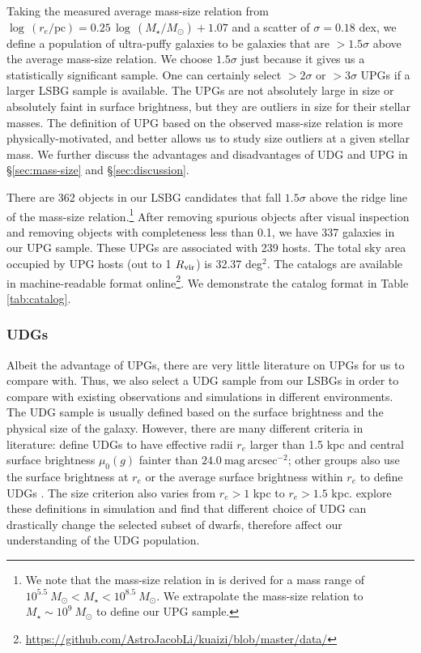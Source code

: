 \documentclass[twocolumn,astrosymb,twocolappendix]{aastex631}
\newcommand{\sbunit}{\mathrm{mag\ arcsec}^{-2}}
\begin{document}
\begin{CJK*}{UTF8}{gbsn}
Taking the measured average mass-size relation from \citet{ELVES-I} $\log\, (r_e/\mathrm{pc}) = 0.25\, \log\, (M_\star/M_\odot) + 1.07$ and a scatter of $\sigma=0.18$ dex, we define a population of ultra-puffy galaxies to be galaxies that are $>1.5\sigma$ above the average mass-size relation. We choose $1.5\sigma$ just because it gives us a statistically significant sample. One can certainly select $>2\sigma$ or $>3\sigma$ UPGs if a larger LSBG sample is available. The UPGs are not absolutely large in size or absolutely faint in surface brightness, but they are outliers in size for their stellar masses. The definition of UPG based on the observed mass-size relation is more physically-motivated, and better allows us to study size outliers at a given stellar mass. We further discuss the advantages and disadvantages of UDG and UPG in \S\ref{sec:mass-size} and \S\ref{sec:discussion}.

There are 362 objects in our LSBG candidates that fall $1.5\sigma$ above the ridge line of the mass-size relation.\footnote{We note that the mass-size relation in \citet{ELVES-I} is derived for a mass range of $10^{5.5}\ M_\odot < M_\star < 10^{8.5}\ M_\odot$. We extrapolate the mass-size relation to $M_\star \sim 10^9\ M_\odot$ to define our UPG sample.} After removing spurious objects after visual inspection and removing objects with completeness less than 0.1, we have 337 galaxies in our UPG sample. These UPGs are associated with 239 hosts. The total sky area occupied by UPG hosts (out to 1 $R_{\rm{vir}}$) is 32.37 deg$^{2}$. The catalogs are available in machine-readable format online\footnote{\url{https://github.com/AstroJacobLi/kuaizi/blob/master/data/}}. We demonstrate the catalog format in Table \ref{tab:catalog}. 

\subsubsection{UDGs}
Albeit the advantage of UPGs, there are very little literature on UPGs for us to compare with. Thus, we also select a UDG sample from our LSBGs in order to compare with existing observations and simulations in different environments. The UDG sample is usually defined based on the surface brightness and the physical size of the galaxy. However, there are many different criteria in literature: \citet{vanDokkum2015} define UDGs to have effective radii $r_e$ larger than 1.5 kpc and central surface brightness $\mu_0(g)$ fainter than $24.0\ \sbunit$; other groups also use the surface brightness at $r_e$ \citep[e.g.,][]{DiCintio2017,Cardona-Barrero2020} or the average surface brightness within $r_e$ to define UDGs \citep[e.g.,][]{Koda2015,Yagi2016,vdBurg2016,Leisman2017,Martin2019}. The size criterion also varies from $r_e > 1$ kpc to $r_e > 1.5$ kpc. \citet{vanNest2022} explore these definitions in simulation and find that different choice of UDG can drastically change the selected subset of dwarfs, therefore affect our understanding of the UDG population.


\end{CJK*}
\end{document}
